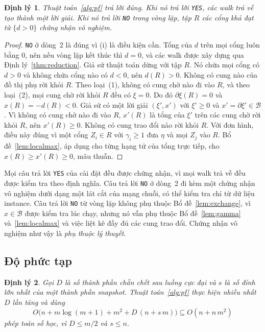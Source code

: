 \documentclass[pdflatex,sn-mathphys-num]{sn-jnl}
\theoremstyle{thmstyleone}%
\newtheorem{theorem}{Định lý}%
\theoremstyle{thmstyletwo}%
\theoremstyle{thmstylethree}%
\newcommand{\cB}{\mathcal{B}}
\newcommand{\YES}{\texttt{YES}}
\newcommand{\NO}{\texttt{NO}}
\begin{document}
\begin{theorem}\label{thm:correct}
Thuật toán~\ref{alg:pf} trả lời đúng. Khi nó trả lời \YES{}, các walk trả về tạo thành một lời giải. Khi nó trả lời \NO{} trong vòng lặp, tập $R$ các cổng khả đạt từ $\{d>0\}$ chứng nhận vô nghiệm.
\end{theorem}

\begin{proof}
\NO{} ở dòng~2 là đúng vì (i) là điều kiện cần. Tổng của $d$ trên mọi cổng luôn bằng $0$, nên nếu vòng lặp kết thúc thì $d=0$, và các walk được xây dựng qua Định lý~\ref{thm:reduction}. Giả sử thuật toán dừng với tập $R$. Nó chứa mọi cổng có $d>0$ và không chứa cổng nào có $d<0$, nên $d(R)>0$. Không có cung nào của đồ thị phụ rời khỏi $R$. Theo loại~(1), không có cung chờ nào đi vào $R$, và theo loại~(2), mọi cung chờ rời khỏi $R$ đều có $\xi=0$. Do đó $\partial\xi(R)=0$ và $x(R)=-d(R)<0$. Giả sử có một lời giải $(\xi',x')$ với $\xi'\ge0$ và $x'=\partial\xi'\in\cB$. Vì không có cung chờ nào đi vào $R$, $x'(R)$ là tổng của $\xi'$ trên các cung chờ rời khỏi $R$, nên $x'(R)\ge0$. Không có cung trao đổi nào rời khỏi $R$. Với đơn hình, điều này đúng vì một cổng $Z_i\in R$ với $\gamma_i\ge1$ đưa $\eta$ và mọi $Z_j$ vào $R$. Bổ đề~\ref{lem:localmax}, áp dụng cho từng hạng tử của tổng trực tiếp, cho $x(R)\ge x'(R)\ge0$, mâu thuẫn.
\end{proof}

Mọi câu trả lời \YES{} của cài đặt đều được chứng nhận, vì mọi walk trả về đều được kiểm tra theo định nghĩa. Câu trả lời \NO{} ở dòng~2 đi kèm một chứng nhận vô nghiệm dưới dạng một lát cắt của mạng chuỗi, có thể kiểm tra chỉ từ dữ liệu instance. Câu trả lời \NO{} từ vòng lặp không phụ thuộc Bổ đề~\ref{lem:exchange}, vì $x\in\cB$ được kiểm tra lúc chạy, nhưng nó vẫn phụ thuộc Bổ đề~\ref{lem:gamma} và~\ref{lem:localmax} và việc liệt kê đầy đủ các cung trao đổi. Chứng nhận vô nghiệm như vậy là \emph{phụ thuộc lý thuyết}.

\subsection{Độ phức tạp}

\begin{theorem}\label{thm:time}
Gọi $D$ là số thành phần chẵn chết sau luồng cực đại và $s$ là số đỉnh lớn nhất của một thành phần snapshot. Thuật toán~\ref{alg:pf} thực hiện nhiều nhất $D$ lần tăng và dùng
\[
  O\bigl(n+m\log(m+1)+m^2+D\,(n+s\,m)\bigr)\subseteq O(n+n\,m^2)
\]
phép toán số học, vì $D\le m/2$ và $s\le n$.
\end{theorem}
\end{document}
